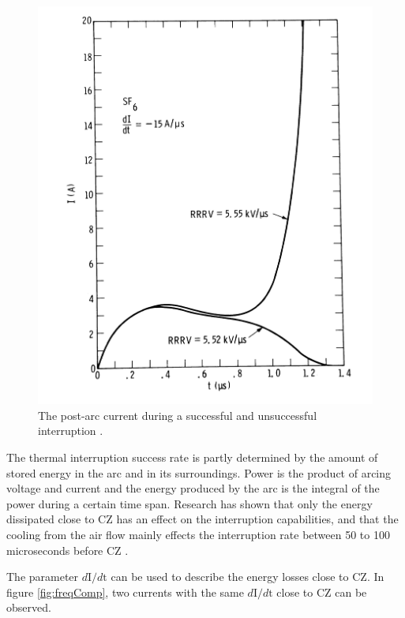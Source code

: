 \documentclass[10pt,b5paper,twoside]{article}
\begin{document}
\begin{figure} [H]
\centering
\includegraphics[scale=0.7]{Bilder/Theory/failSuccPAC.png}
\caption{The post-arc current during a successful and unsuccessful interruption \cite{bib:CIHVN}.} \label{fig:PACbreakandreIgnite}
\end{figure}

The thermal interruption success rate is partly determined by the amount of stored energy in the arc and in its surroundings. Power is the product of arcing voltage and current and the energy produced by the arc is the integral of the power during a certain time span. Research has shown that only the energy dissipated close to CZ has an effect on the interruption capabilities, and that the cooling from the air flow mainly effects the interruption rate between 50 to 100 microseconds before CZ \cite{bib:CIHVN}.

The parameter $d \mathrm{I}/d \mathrm{t}$ can be used to describe the energy losses close to CZ. In figure \ref{fig:freqComp}, two currents with the same $d \mathrm{I}/d \mathrm{t}$ close to CZ can be observed.
\end{document}
